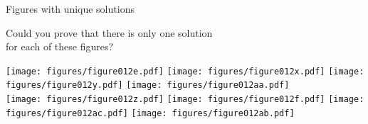 \documentclass[14pt]{beamer}
\begin{document}

    \begin{frame}{Figures with unique solutions}

        \vspace{-1em}
        \begin{center}
            Could you prove that there is only one solution\\for each of these figures?

            \bigskip\bigskip

            \texttt{[image: figures/figure012e.pdf]}\quad
            \texttt{[image: figures/figure012x.pdf]}\quad
            \texttt{[image: figures/figure012y.pdf]}\!\!\!\!\!\!\!\!
            \texttt{[image: figures/figure012aa.pdf]}  \\[4ex]\quad
            \texttt{[image: figures/figure012z.pdf]}\qquad
            \texttt{[image: figures/figure012f.pdf]}\quad\;\;\;
            \texttt{[image: figures/figure012ac.pdf]}\quad
            \texttt{[image: figures/figure012ab.pdf]}\;\;\; \\
        \end{center}
    \end{frame}



\end{document}
